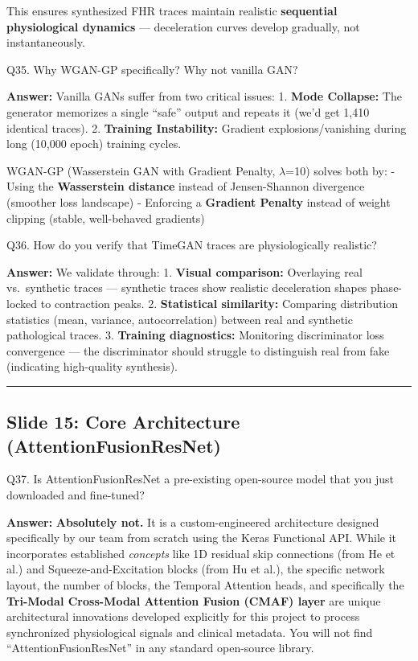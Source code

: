 \documentclass[11pt,a4paper]{article}
\begin{document}
This ensures synthesized FHR traces maintain realistic
\textbf{sequential physiological dynamics} --- deceleration curves
develop gradually, not instantaneously.

\begin{questionbox}
Q35. Why WGAN-GP specifically? Why not vanilla GAN?
\end{questionbox}
\textbf{Answer:} Vanilla GANs suffer from two critical issues: 1.
\textbf{Mode Collapse:} The generator memorizes a single ``safe'' output
and repeats it (we'd get 1,410 identical traces). 2. \textbf{Training
Instability:} Gradient explosions/vanishing during long (10,000 epoch)
training cycles.

WGAN-GP (Wasserstein GAN with Gradient Penalty, $\lambda$=10) solves both by: -
Using the \textbf{Wasserstein distance} instead of Jensen-Shannon
divergence (smoother loss landscape) - Enforcing a \textbf{Gradient
Penalty} instead of weight clipping (stable, well-behaved gradients)

\begin{questionbox}
Q36. How do you verify that TimeGAN traces are physiologically
realistic?
\end{questionbox}
\textbf{Answer:} We validate through: 1. \textbf{Visual comparison:}
Overlaying real vs.~synthetic traces --- synthetic traces show realistic
deceleration shapes phase-locked to contraction peaks. 2.
\textbf{Statistical similarity:} Comparing distribution statistics
(mean, variance, autocorrelation) between real and synthetic
pathological traces. 3. \textbf{Training diagnostics:} Monitoring
discriminator loss convergence --- the discriminator should struggle to
distinguish real from fake (indicating high-quality synthesis).

\begin{center}\rule{0.5\linewidth}{0.5pt}\end{center}

\subsection{Slide 15: Core Architecture
(AttentionFusionResNet)}\label{slide-15-core-architecture-attentionfusionresnet}

\begin{questionbox}
Q37. Is AttentionFusionResNet a pre-existing open-source model
that you just downloaded and fine-tuned?
\end{questionbox}
\textbf{Answer:} \textbf{Absolutely not.} It is a custom-engineered
architecture designed specifically by our team from scratch using the
Keras Functional API. While it incorporates established \emph{concepts}
like 1D residual skip connections (from He et al.) and
Squeeze-and-Excitation blocks (from Hu et al.), the specific network
layout, the number of blocks, the Temporal Attention heads, and
specifically the \textbf{Tri-Modal Cross-Modal Attention Fusion (CMAF)
layer} are unique architectural innovations developed explicitly for
this project to process synchronized physiological signals and clinical
metadata. You will not find ``AttentionFusionResNet'' in any standard
open-source library.
\end{document}

